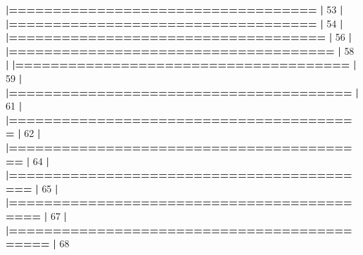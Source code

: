 \documentclass[]{book}
\newenvironment{Shaded}{\begin{snugshade}}{\end{snugshade}}
\newcommand{\DecValTok}[1]{\textcolor[rgb]{0.00,0.00,0.81}{#1}}
\newcommand{\ErrorTok}[1]{\textcolor[rgb]{0.64,0.00,0.00}{\textbf{#1}}}
\newcommand{\NormalTok}[1]{#1}
\newcommand{\OperatorTok}[1]{\textcolor[rgb]{0.81,0.36,0.00}{\textbf{#1}}}
\newcommand{\StringTok}[1]{\textcolor[rgb]{0.31,0.60,0.02}{#1}}
\begin{document}
\begin{Shaded}
\begin{Highlighting}[]
{{{{{{{{{{{{{{{{{{{{{{{{{{{{{{{{{{{{{{{\StringTok{  }\ErrorTok{|===================================}\StringTok{                              }\ErrorTok{|}\StringTok{  }\DecValTok{53}\NormalTok{%}
  \OperatorTok{|}\StringTok{                                                                       }
\StringTok{  }\ErrorTok{|===================================}\StringTok{                              }\ErrorTok{|}\StringTok{  }\DecValTok{54}\NormalTok{%}
  \OperatorTok{|}\StringTok{                                                                       }
\StringTok{  }\ErrorTok{|====================================}\StringTok{                             }\ErrorTok{|}\StringTok{  }\DecValTok{56}\NormalTok{%}
  \OperatorTok{|}\StringTok{                                                                       }
\StringTok{  }\ErrorTok{|=====================================}\StringTok{                            }\ErrorTok{|}\StringTok{  }\DecValTok{58}\NormalTok{%}
  \OperatorTok{|}\StringTok{                                                                       }
\StringTok{  }\ErrorTok{|======================================}\StringTok{                           }\ErrorTok{|}\StringTok{  }\DecValTok{59}\NormalTok{%}
  \OperatorTok{|}\StringTok{                                                                       }
\StringTok{  }\ErrorTok{|=======================================}\StringTok{                          }\ErrorTok{|}\StringTok{  }\DecValTok{61}\NormalTok{%}
  \OperatorTok{|}\StringTok{                                                                       }
\StringTok{  }\ErrorTok{|========================================}\StringTok{                         }\ErrorTok{|}\StringTok{  }\DecValTok{62}\NormalTok{%}
  \OperatorTok{|}\StringTok{                                                                       }
\StringTok{  }\ErrorTok{|=========================================}\StringTok{                        }\ErrorTok{|}\StringTok{  }\DecValTok{64}\NormalTok{%}
  \OperatorTok{|}\StringTok{                                                                       }
\StringTok{  }\ErrorTok{|==========================================}\StringTok{                       }\ErrorTok{|}\StringTok{  }\DecValTok{65}\NormalTok{%}
  \OperatorTok{|}\StringTok{                                                                       }
\StringTok{  }\ErrorTok{|===========================================}\StringTok{                      }\ErrorTok{|}\StringTok{  }\DecValTok{67}\NormalTok{%}
  \OperatorTok{|}\StringTok{                                                                       }
\StringTok{  }\ErrorTok{|============================================}\StringTok{                     }\ErrorTok{|}\StringTok{  }\DecValTok{68}\NormalTok{%}
}}}}}}}}}}}}}}}}}}}}}}}}}}}}}}}}}}}}}}}}}}}}}}}}}}
\end{Highlighting}
\end{Shaded}
\end{document}
